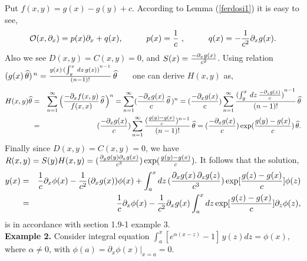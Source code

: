 \documentclass[10pt]{article}
\newcommand{\be}{\begin{equation}}
\newcommand{\ee}{\end{equation}}
\newcommand{\bea}{\begin{eqnarray}}
\newcommand{\eea}{\end{eqnarray}}
\newcommand{\nn}{\nonumber}
\newcommand{\rd}{\partial}
\begin{document}
{{Put $f(x,y)=g(x)-g(y)+c$. According to Lemma (\ref{ferdosi1}) it is
easy to see,
 \be
\mathcal{O}(x,\rd_{x})=p(x)\rd_{x}+q(x),\hspace{1cm} p(x)={1\over
c}\,\,, \hspace{1cm} q(x)=-{1\over c^2}\rd_{x}g(x).\nn\ee Also we
see $D(x,y)=C(x,y)=0$, and $S(x)={{-\rd_{x}g(x)}\over c^2}$. Using
relation $(g(x)\,\widehat{\theta})^{\,n}={{g(x)\,(\int^{x}_{y}\,
dz\, g(z))}^{n-1} \over (n-1)!}\,\widehat{\theta}\hspace{0.5cm}$ one
can derive $H(x,y)$ as, \bea
H(x,y)\widehat{\theta}&=&\sum^{\infty}_{n=1}\Big({-\rd_{x}
f(x,y)\over
f(x,x)}\,\widehat{\theta}\,\Big)^{n}=\sum^{\infty}_{n=1}({-{\rd_{x}g(x)}\over
c}\,\widehat{\theta}\,)^{n}=({-{\rd_{x}g(x)}\over
c})\sum^{\infty}_{n=1}{{(\int^{x}_{y}\, dz\,{-{\rd_{z}g(z)}\over
c})}^{n-1} \over (n-1)!}\,\widehat{\theta}\nn\\
&=&({-{\rd_{x}g(x)}\over c} )\sum^{\infty}_{n=1}{({g(y)-g(x)\over
c})^{n-1} \over (n-1)!}\,\widehat{\theta}=({-{\rd_{x}g(x)}\over
c})\exp({g(y)-g(x)\over c})\,\widehat{\theta}.\nn\eea Finally since
$D(x,y)=C(x,y)=0$, we have $
R(x,y)=S(y)H(x,y)=({{\rd_{y}g(y)}{\rd_{x}g(x)}\over
c^3})\exp({g(y)-g(x)\over c}).$ It follows that the solution,\bea
y(x)&=&{1\over c}\rd_{x}\phi(x)-{1\over c^2}(\rd_{x}g(x)) \phi(x)
+\int^{x}_{a} dz \,({\rd_{x}g(x)\,\rd_{z}g(z)\over
c^3})\exp[{{g(z)-g(x)}\over c}]\phi(z)\nn\\&=&{1\over
c}\rd_{x}\phi(x)-{1\over c^2}\rd_{x}g(x)\int^{x}_{a}dz
\exp[{g(z)-g(x)\over c}]\rd_{z}\phi(z),\nn\eea is in accordance with
\cite{polyan} section 1.9-1 example 3.\\

{\bf Example 2.} Consider integral equation
$\displaystyle\int^{x}_{a}[e^{\alpha(x-z)}-1]\,y(z) dz=\phi(x),\,\,$
where $\alpha\ne0$, with
$\phi(a)=\rd_{x}\phi(x)|_{x=a}=0$.\\


}}
\end{document}
